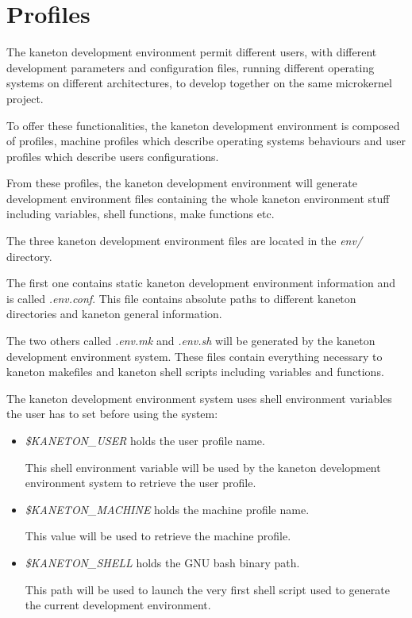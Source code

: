 \section{Profiles}

The kaneton development environment permit different users, with different
development parameters and configuration files, running different operating
systems on different architectures, to develop together on the same
microkernel project.

To offer these functionalities, the kaneton development environment is
composed of profiles, machine profiles which describe operating systems
behaviours and user profiles which describe users configurations.

From these profiles, the kaneton development environment will generate
development environment files containing the whole kaneton environment
stuff including variables, shell functions, make functions etc.

The three kaneton development environment files are located in the
\textit{env/} directory.

The first one contains static kaneton development environment information
and is called \textit{.env.conf}. This file contains absolute paths
to different kaneton directories and kaneton general information.

The two others called \textit{.env.mk} and \textit{.env.sh} will be generated
by the kaneton development environment system. These files contain
everything necessary to kaneton makefiles and kaneton shell scripts
including variables and functions.

The kaneton development environment system uses shell environment variables
the user has to set before using the system:

\begin{itemize}
  \item
    \textit{\$KANETON\_USER} holds the user profile name.

    This shell environment variable will be used by the kaneton development
    environment system to retrieve the user profile.
  \item
    \textit{\$KANETON\_MACHINE} holds the machine profile name.

    This value will be used to retrieve the machine profile.
  \item
    \textit{\$KANETON\_SHELL} holds the GNU bash binary path.

    This path will be used to launch the very first shell script used to
    generate the current development environment.
\end{itemize}

